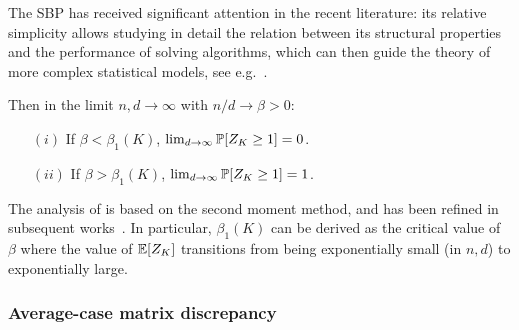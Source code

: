 The SBP has received significant attention in the recent literature:
its relative simplicity allows studying in detail the relation between its structural properties and the performance of 
solving algorithms, 
which can then guide the theory of more complex statistical models,
see e.g.\ \cite{aubin2019storage,perkins2021frozen,abbe2022proof,gamarnik2022algorithms,kizildag2023symmetric,barbier2024atypical,alaoui2024hardness,barbier2024escape}.
\begin{theorem}\label{thm:trans_SBP}
    Then in the limit $n, d \to \infty$ with $n / d \to \beta > 0$:
    \begin{itemize}
        \item[$(i)$] If $\beta < \beta_1(K)$, $\lim_{d \to \infty} \mathbb{P}[Z_K \geq 1] = 0$. 
        \item[$(ii)$] If $\beta > \beta_1(K)$, $\lim_{d \to \infty} \mathbb{P}[Z_K \geq 1] = 1$. 
    \end{itemize}
\end{theorem} 
\noindent
The analysis of \cite{aubin2019storage} is based on the second moment method, and has been refined in subsequent works~\citep{abbe2022proof,gamarnik2022algorithms}. In particular, 
$\beta_1(K)$ can be derived as the critical value of $\beta$ where the value of $\mathbb{E}[Z_K]$ 
transitions from being exponentially small (in $n,d$) to exponentially large.


\subsubsection{Average-case matrix discrepancy}\label{subsubsec:average_mdiscrepancy}


